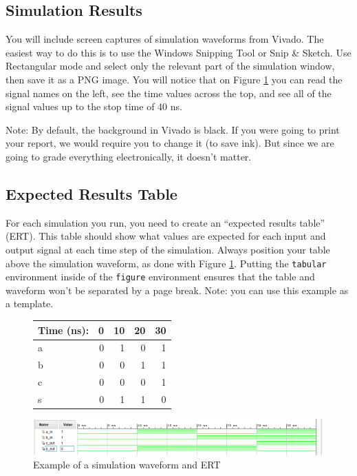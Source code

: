 \documentclass[11pt]{article}
\begin{document}
\subsection*{Simulation Results}
You will include screen captures of simulation waveforms from Vivado.  The easiest way to do this is to use the Windows Snipping Tool or Snip \& Sketch.  Use Rectangular mode and select only the relevant part of the simulation window, then save it as a PNG image.  You will notice that on Figure \ref{fig:sim_with_table} you can read the signal names on the left, see the time values across the top, and see all of the signal values up to the stop time of 40 ns. 

Note: By default, the background in Vivado is black. If you were going to print your report, we would require you to change it (to save ink).  But since we are going to grade everything electronically, it doesn't matter.


\subsection*{Expected Results Table}
For each simulation you run, you need to create an ``expected results table'' (ERT).  This table should show what values are expected for each input and output signal at each time step of the simulation.  Always position your table above the simulation waveform, as done with Figure \ref{fig:sim_with_table}.  Putting the \texttt{tabular} environment inside of the \texttt{figure} environment ensures that the table and waveform won't be separated by a page break.  Note: you can use this example as a template.

\begin{figure}[ht]\centering
	\begin{tabular}{l|rrrr}
		Time (ns): & 0 & 10 & 20 & 30 \\
		\midrule
		a & 0 & 1 & 0 & 1 \\
		b & 0 & 0 & 1 & 1 \\
		\midrule
		c & 0 & 0 & 0 & 1 \\
		s & 0 & 1 & 1 & 0 \\
		\bottomrule
	\end{tabular}\medskip
	
	\includegraphics{sim_waveform}
	\caption{Example of a simulation waveform and ERT}
	\label{fig:sim_with_table}
\end{figure}
\end{document}
